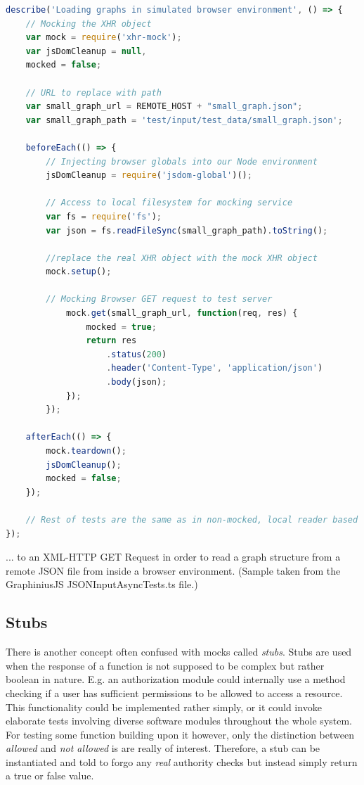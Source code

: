 	\begin{lstlisting}[caption={A mocking setup simulating a Web Server GET response.}, label={fig:mock_service_test}, language=JavaScript]
describe('Loading graphs in simulated browser environment', () => {		
	// Mocking the XHR object
	var mock = require('xhr-mock');
	var jsDomCleanup = null,
	mocked = false;
	
	// URL to replace with path
	var small_graph_url = REMOTE_HOST + "small_graph.json";
	var small_graph_path = 'test/input/test_data/small_graph.json';
	
	beforeEach(() => {		
		// Injecting browser globals into our Node environment
		jsDomCleanup = require('jsdom-global')();
		
		// Access to local filesystem for mocking service
		var fs = require('fs');
		var json = fs.readFileSync(small_graph_path).toString();
		
		//replace the real XHR object with the mock XHR object
		mock.setup();
	
		// Mocking Browser GET request to test server
			mock.get(small_graph_url, function(req, res) {
				mocked = true;
				return res
					.status(200)
					.header('Content-Type', 'application/json')
					.body(json);
			});
		});
		
	afterEach(() => {
		mock.teardown();
		jsDomCleanup();
		mocked = false;
	});
	
	// Rest of tests are the same as in non-mocked, local reader based input tests
});
	\end{lstlisting}
	\small
	... to an XML-HTTP GET Request in order to read a graph structure from a remote JSON file from inside a browser environment. (Sample taken from the GraphiniusJS JSONInputAsyncTests.ts file.)
	
	
	\subsection{Stubs}
	\label{ssect:stubs}
	There is another concept often confused with mocks called \textit{stubs}. Stubs are used when the response of a function is not supposed to be complex but rather boolean in nature. E.g. an authorization module could internally use a method checking if a user has sufficient permissions to be allowed to access a resource. This functionality could be implemented rather simply, or it could invoke elaborate tests involving diverse software modules throughout the whole system. For testing some function building upon it however, only the distinction between \textit{allowed} and \textit{not allowed} is are really of interest. Therefore, a stub can be instantiated and told to forgo any \textit{real} authority checks but instead simply return a true or false value. 
	
